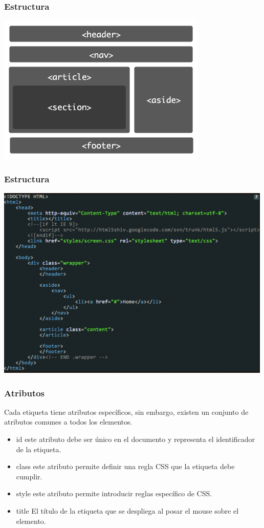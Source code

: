 \documentclass[12pt]{beamer}
\begin{document}
\begin{frame}
 \frametitle{Estructura}
 \begin{center}
    \includegraphics[scale=0.5]{img/html5structure.png}
 \end{center}
\end{frame}

\begin{frame}
 \frametitle{Estructura}
 \begin{center}
    \includegraphics[scale=0.5]{img/html5code.png}
 \end{center}
\end{frame}


\begin{frame}
 \frametitle{Atributos}
 Cada etiqueta tiene atributos específicos, sin embargo, existen un conjunto de atributos comunes a todos los elementos.
 \begin{itemize}
  \item<2-> \alert{id} este atributo debe ser único en el documento y representa el identificador de la etiqueta.
  \item<3-> \alert{class} este atributo permite definir una regla CSS que la etiqueta debe cumplir.
  \item<4-> \alert{style} este atributo permite introducir reglas específico de CSS.
  \item<5-> \alert{title} El título de la etiqueta que se despliega al posar el mouse sobre el elemento.
 \end{itemize}
\end{frame}
\end{document}
